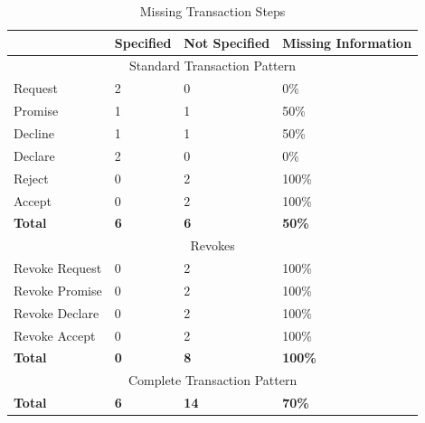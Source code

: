 \begin{table}[h]\centering
\caption{Missing Transaction Steps}
\label{tab:missing_transaction_steps}
\begin{tabular}{|l||l|l|l|}
\hline
                      & Specified    & Not Specified & Missing Information \\ \hline
\multicolumn{4}{|c|}{Standard Transaction Pattern}                        \\ \hline
Request               & 2           & 0            & 0\%             \\ \hline
Promise               & 1           & 1            & 50\%            \\ \hline
Decline               & 1          & 1           & 50\%             \\ \hline
Declare               & 2           & 0            & 0\%              \\ \hline
Reject                & 0            & 2           & 100\%             \\ \hline
Accept                & 0           & 2            & 100\%            \\ \hline
\textbf{Total}        & \textbf{6} & \textbf{6}  & \textbf{50\%}   \\ \hline
\multicolumn{4}{|c|}{Revokes}                                             \\ \hline
Revoke Request        & 0            & 2           & 100\%             \\ \hline
Revoke Promise        & 0            & 2           & 100\%             \\ \hline
Revoke Declare        & 0            & 2           & 100\%            \\ \hline
Revoke Accept         & 0            & 2           & 100\%             \\ \hline
\textbf{Total}        & \textbf{0}   & \textbf{8} & \textbf{100\%}    \\ \hline
\multicolumn{4}{|c|}{Complete Transaction Pattern}                        \\ \hline
\textbf{Total}        & \textbf{6} & \textbf{14} & \textbf{70\%}    \\ \hline
\end{tabular}

\end{table}
